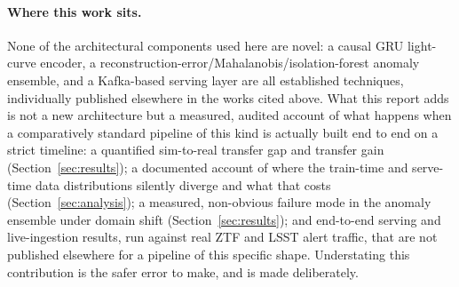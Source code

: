 \paragraph{Where this work sits.}
None of the architectural components used here are novel: a causal GRU
light-curve encoder, a reconstruction-error/Mahalanobis/isolation-forest
anomaly ensemble, and a Kafka-based serving layer are all established
techniques, individually published elsewhere in the works cited above. What
this report adds is not a new architecture but a measured, audited account
of what happens when a comparatively standard pipeline of this kind is
actually built end to end on a strict timeline: a quantified sim-to-real
transfer gap and transfer gain (Section~\ref{sec:results}); a documented
account of where the train-time and serve-time data distributions silently
diverge and what that costs (Section~\ref{sec:analysis}); a measured,
non-obvious failure mode in the anomaly ensemble under domain shift
(Section~\ref{sec:results}); and end-to-end serving and live-ingestion
results, run against real ZTF and LSST alert traffic, that are not published
elsewhere for a pipeline of this specific shape. Understating this
contribution is the safer error to make, and is made deliberately.
